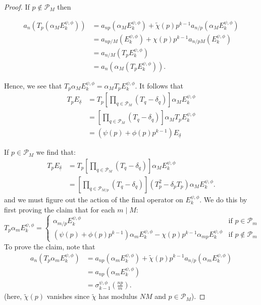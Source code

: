 \documentclass[10pt,a4paper]{amsart}
\begin{document}
\begin{proof}
If $p \notin \mathcal{P}_M$ then

\begin{align*}
    a_n(T_p(\alpha_M E_k^{\psi, \phi})) &= a_{np}(\alpha_M E_k^{\psi, \phi}) + \tilde{\chi}(p)p^{k-1}a_{n/p}(\alpha_M E_k^{\psi,\phi}) \\
    &= a_{np/M}(E_k^{\psi,\phi}) + \chi(p)p^{k-1}a_{n/pM}(E_k^{\psi,\phi}) \\
    &= a_{n/M}(T_pE_k^{\psi,\phi}) \\
    &= a_n(\alpha_M (T_p E_k^{\psi,\phi})).
\end{align*}

\noindent Hence, we see that $T_p \alpha_M E_k^{\psi,\phi} = \alpha_M T_p E_k^{\psi,\phi}$. It follows that 
\begin{align*}
    T_pE_{\underline{\delta}}&=T_p \left[\prod_{q\in \mathcal{P}_M} (T_q - \delta_q)\right]\alpha_ME_k^{\psi,\phi} \\
    &=\left[\prod_{q\in \mathcal{P}_M} (T_q - \delta_q)\right]\alpha_M T_pE_k^{\psi,\phi} \\
    &=(\psi(p)+\phi(p)p^{k-1})E_{\underline{\delta}}
\end{align*}

\noindent If $p \in \mathcal{P}_M$ we find that: \begin{align*}T_pE_{\underline{\delta}}&=T_p \left[\prod_{q\in \mathcal{P}_M} (T_q - \delta_q)\right]\alpha_ME_k^{\psi,\phi} \\
    &=\left[\prod_{q\in \mathcal{P}_{M/p}} (T_q - \delta_q)\right](T_p^2-\delta_pT_p)\alpha_M E_k^{\psi,\phi}.\end{align*} and we must figure out the action of the final operator on $E_k^{\psi,\phi}$. We do this by first proving the claim that for each $m\mid M$:
\begin{equation*}
T_p\alpha_m E_k^{\psi, \phi} = 
    \begin{cases}
    \alpha_{m/p}E_k^{\psi,\phi} & \text{if } p \in 
    \mathcal{P}_m \\
    (\psi(p)+\phi(p)p^{k-1})\alpha_{m}E_k^{\psi,\phi}-\chi(p)p^{k-1}\alpha_{mp}E_k^{\psi,\phi} & \text{if } p \notin 
    \mathcal{P}_m
    \end{cases}
\end{equation*}
To prove the claim, note that
\begin{align*}
    a_n(T_p\alpha_m E_k^{\psi,\phi})&=a_{np}(\alpha_m E_k^{\psi,\phi}) + \tilde{\chi}(p)p^{k-1}a_{n/p}(\alpha_m E_k^{\psi,\phi}) \\
    &= a_{np}(\alpha_m E_k^{\psi,\phi}) \\
    &= \sigma_{k-1}^{\psi,\phi}\left(\frac{np}{m}\right).
\end{align*}
(here, $\tilde{\chi}(p)$ vanishes since $\tilde{\chi}$ has modulus $NM$ and $p \in \mathcal{P}_M$).


\end{proof}
\end{document}
